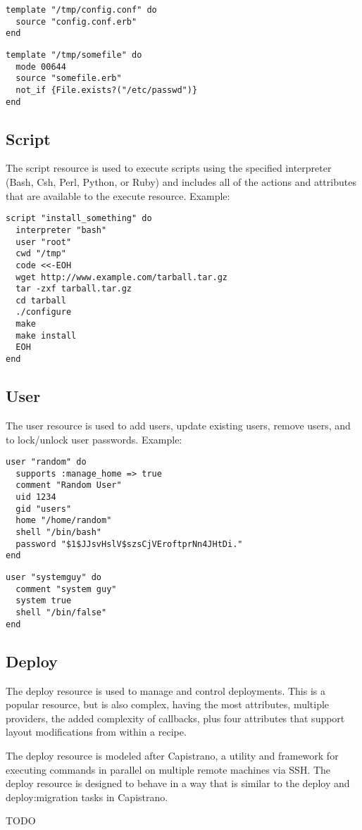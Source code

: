 \begin{lstlisting}[label=lst:cookbook-resources-cookbook-template1]
template "/tmp/config.conf" do
  source "config.conf.erb"
end
\end{lstlisting}

\begin{lstlisting}[label=lst:cookbook-resources-cookbook-template2]
template "/tmp/somefile" do
  mode 00644
  source "somefile.erb"
  not_if {File.exists?("/etc/passwd")}
end
\end{lstlisting}

\subsection{Script}

The script resource is used to execute scripts using the specified interpreter (Bash, Csh, Perl, Python, or Ruby) and includes all of the actions and attributes that are available to the execute resource. Example:

\begin{lstlisting}[label=lst:cookbook-resources-cookbook-script1]
script "install_something" do
  interpreter "bash"
  user "root"
  cwd "/tmp"
  code <<-EOH
  wget http://www.example.com/tarball.tar.gz
  tar -zxf tarball.tar.gz
  cd tarball
  ./configure
  make
  make install
  EOH
end
\end{lstlisting}

\subsection{User}

The user resource is used to add users, update existing users, remove users, and to lock/unlock user passwords. Example:

\begin{lstlisting}[label=lst:cookbook-resources-cookbook-user1]
user "random" do
  supports :manage_home => true
  comment "Random User"
  uid 1234
  gid "users"
  home "/home/random"
  shell "/bin/bash"
  password "$1$JJsvHslV$szsCjVEroftprNn4JHtDi."
end
\end{lstlisting}

\begin{lstlisting}[label=lst:cookbook-resources-cookbook-user2]
user "systemguy" do
  comment "system guy"
  system true
  shell "/bin/false"
end
\end{lstlisting}

\subsection{Deploy}

The deploy resource is used to manage and control deployments. This is a popular resource, but is also complex, having the most attributes, multiple providers, the added complexity of callbacks, plus four attributes that support layout modifications from within a recipe.

The deploy resource is modeled after Capistrano, a utility and framework for executing commands in parallel on multiple remote machines via SSH. The deploy resource is designed to behave in a way that is similar to the deploy and deploy:migration tasks in Capistrano.

TODO
